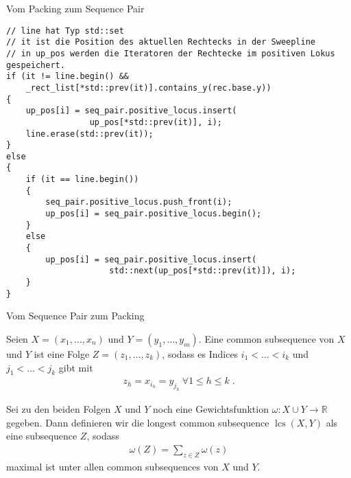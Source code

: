\documentclass{beamer}
\DeclareMathOperator{\lcs}{lcs}
\begin{document}
\begin{frame}{Vom Packing zum Sequence Pair}
\begin{figure}
\begin{tikzpicture}[x=5mm,y=5mm]
  
  \end{tikzpicture}
\end{figure}

\end{frame}

\begin{frame}[fragile]
 \begin{lstlisting}[basicstyle=\scriptsize]
// line hat Typ std::set
// it ist die Position des aktuellen Rechtecks in der Sweepline
// in up_pos werden die Iteratoren der Rechtecke im positiven Lokus gespeichert.
if (it != line.begin() && 
    _rect_list[*std::prev(it)].contains_y(rec.base.y))
{
    up_pos[i] = seq_pair.positive_locus.insert(
                 up_pos[*std::prev(it)], i);
    line.erase(std::prev(it));
}
else
{
    if (it == line.begin())
    {
        seq_pair.positive_locus.push_front(i);
        up_pos[i] = seq_pair.positive_locus.begin();
    }
    else
    {
        up_pos[i] = seq_pair.positive_locus.insert(
                     std::next(up_pos[*std::prev(it)]), i);
    }
}
 \end{lstlisting}
\end{frame}


\begin{frame}{Vom Sequence Pair zum Packing}
\begin{definition}
 Seien $X= (x_1,\dots,x_n)$ und $Y=(y_1,\dots, y_m)$. Eine common subsequence von $X$ und $Y$ ist eine Folge $Z=(z_1,\dots, z_k)$, sodass es Indices $i_1<\dots< i_k$ und $j_1 <\dots < j_k$ gibt mit
 \begin{align*}
  z_h = x_{i_h} = y_{j_h} ~\forall 1\leq h\leq k\;.
 \end{align*}
\end{definition}
\begin{definition}
 Sei zu den beiden Folgen $X$ und $Y$ noch eine Gewichtsfunktion $\omega: X\cup Y \to \mathbb{R}$ gegeben. Dann definieren wir die longest common subsequence $\lcs(X,Y)$ als eine subsequence $Z$, sodass 
 \begin{align*}
  \omega(Z) = \sum_{z\in Z} \omega(z)
 \end{align*}
 maximal ist unter allen common subsequences von $X$ und $Y$.
\end{definition}
\end{frame}
\end{document}
